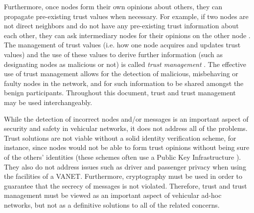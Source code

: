 Furthermore, once nodes form their own opinions about others, they can propagate pre-existing trust values when necessary.
For example, if two nodes are not direct neighbors and do not have any pre-existing trust information about each other, they can ask intermediary nodes for their opinions on the other node \citep{wang2009trust}.
The management of trust values (i.e. how one node acquires and updates trust values) and the use of these values to derive further information (such as designating nodes as malicious or not) is called \textit{trust management} \citep{ma2011survey}. 
The effective use of trust management allows for the detection of malicious, misbehaving or faulty nodes in the network, and for such information to be shared amongst the benign participants. 
Throughout this document, trust and trust management may be used interchangeably.


While the detection of incorrect nodes and/or messages is an important aspect of security and safety in vehicular networks, it does not address all of the problems.
Trust solutions are not viable without a solid identity verification scheme, for instance, since nodes would not be able to form trust opinions without being sure of the others' identities (these schemes often use a Public Key Infrastructure \citep{wasef2010complementing}).
They also do not address issues such as driver and passenger privacy when using the facilities of a VANET.
Furthermore, cryptography must be used in order to guarantee that the secrecy of messages is not violated.
Therefore, trust and trust management must be viewed as an important aspect of vehicular ad-hoc networks, but not as a definitive solutions to all of the related concerns.

